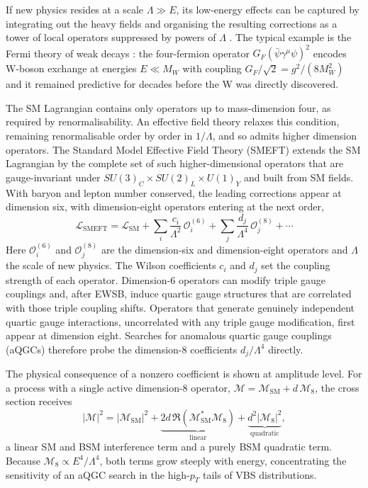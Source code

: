 If new physics resides at a scale $\Lambda \gg E$, its low-energy effects can be captured by integrating out the heavy fields and organising the resulting corrections as a tower of local operators suppressed by powers of $\Lambda$ \cite{AppelquistCarazzone_EFT_1975}. The typical example is the Fermi theory of weak decays \cite{Fermi_Beta_1933}: the four-fermion operator $G_{F}(\bar{\psi}\gamma^{\mu}\psi)^{2}$ encodes W-boson exchange at energies $E\ll M_W$ with coupling $G_{F}/\sqrt{2}=g^{2}/(8M_{W}^{2})$ and it remained predictive for decades before the W was directly discovered.

The SM Lagrangian contains only operators up to mass-dimension four, as required by renormalisability. An effective field theory relaxes this condition, remaining renormalisable order by order in $1/\Lambda$, and so admits higher dimension operators. The Standard Model Effective Field Theory (SMEFT) \cite{BrivioTrott_EFT_2019} extends the SM Lagrangian by the complete set of such higher-dimensional operators that are gauge-invariant under $SU(3)_{C}\times SU(2)_{L}\times U(1)_{Y}$ and built from SM fields. With baryon and lepton number conserved, the leading corrections appear at dimension six, with dimension-eight operators entering at the next order,
\begin{equation}
\mathcal{L}_{\mathrm{SMEFT}} = \mathcal{L}_{\mathrm{SM}} + \sum_{i}\frac{c_{i}}{\Lambda^{2}}\,\mathcal{O}^{(6)}_{i} + \sum_{j}\frac{d_{j}}{\Lambda^{4}}\,\mathcal{O}^{(8)}_{j} + \cdots
\label{eq:smeft}
\end{equation}
Here $\mathcal{O}^{(6)}_{i}$ and $\mathcal{O}^{(8)}_{j}$ are the dimension-six and dimension-eight operators and $\Lambda$ the scale of new physics. The Wilson coefficients $c_{i}$ and $d_{j}$ set the coupling strength of each operator. Dimension-6 operators can modify triple gauge couplings and, after EWSB, induce quartic gauge structures that are correlated with those triple coupling shifts. Operators that generate genuinely independent quartic gauge interactions, uncorrelated with any triple gauge modification, first appear at dimension eight. Searches for anomalous quartic gauge couplings (aQGCs) therefore probe the dimension-8 coefficients $d_j/\Lambda^4$ directly.

The physical consequence of a nonzero coefficient is shown at amplitude level. For a process with a single active dimension-8 operator, $\mathcal{M}=\mathcal{M}_{\mathrm{SM}}+d\,\mathcal{M}_{8}$, the cross section receives
\begin{equation}
|\mathcal{M}|^{2} = |\mathcal{M}_{\mathrm{SM}}|^{2} + \underbrace{2d\,\Re\!\left(\mathcal{M}_{\mathrm{SM}}^{*}\mathcal{M}_{8}\right)}_{\text{linear}} + \underbrace{d^{2}|\mathcal{M}_{8}|^{2}}_{\text{quadratic}},
\end{equation}
a linear SM and BSM interference term and a purely BSM quadratic term. Because $\mathcal{M}_{8}\propto E^{4}/\Lambda^{4}$, both terms grow steeply with energy, concentrating the sensitivity of an aQGC search in the high-$p_{T}$ tails of VBS distributions.

